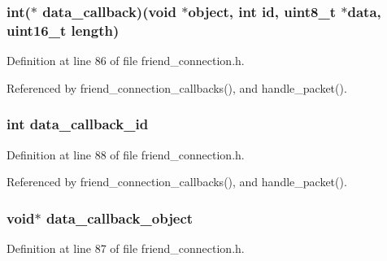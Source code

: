 \hypertarget{struct_friend___conn_aeff54fdc061a263f5d331a9e0572fee7}{
\subsubsection[{data\+\_\+callback}]{\setlength{\rightskip}{0pt plus 5cm}int($\ast$ data\+\_\+callback)(void $\ast$object, int id, uint8\+\_\+t $\ast$data, uint16\+\_\+t length)}}\label{struct_friend___conn_aeff54fdc061a263f5d331a9e0572fee7}


Definition at line 86 of file friend\+\_\+connection.\+h.



Referenced by friend\+\_\+connection\+\_\+callbacks(), and handle\+\_\+packet().

\hypertarget{struct_friend___conn_a51067e0002b1d9ac8e14377917289292}{
\subsubsection[{data\+\_\+callback\+\_\+id}]{\setlength{\rightskip}{0pt plus 5cm}int data\+\_\+callback\+\_\+id}}\label{struct_friend___conn_a51067e0002b1d9ac8e14377917289292}


Definition at line 88 of file friend\+\_\+connection.\+h.



Referenced by friend\+\_\+connection\+\_\+callbacks(), and handle\+\_\+packet().

\hypertarget{struct_friend___conn_a9135a1782241a1b2d5e9bcedef0c29a5}{
\subsubsection[{data\+\_\+callback\+\_\+object}]{\setlength{\rightskip}{0pt plus 5cm}void$\ast$ data\+\_\+callback\+\_\+object}}\label{struct_friend___conn_a9135a1782241a1b2d5e9bcedef0c29a5}


Definition at line 87 of file friend\+\_\+connection.\+h.



